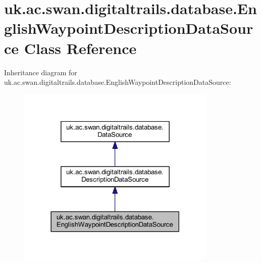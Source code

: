 \hypertarget{classuk_1_1ac_1_1swan_1_1digitaltrails_1_1database_1_1_english_waypoint_description_data_source}{\section{uk.\+ac.\+swan.\+digitaltrails.\+database.\+English\+Waypoint\+Description\+Data\+Source Class Reference}
\label{classuk_1_1ac_1_1swan_1_1digitaltrails_1_1database_1_1_english_waypoint_description_data_source}
}


Inheritance diagram for uk.\+ac.\+swan.\+digitaltrails.\+database.\+English\+Waypoint\+Description\+Data\+Source\+:\nopagebreak
\begin{figure}[H]
\begin{center}
\leavevmode
\includegraphics[width=270pt]{classuk_1_1ac_1_1swan_1_1digitaltrails_1_1database_1_1_english_waypoint_description_data_source__inherit__graph}
\end{center}
\end{figure}


